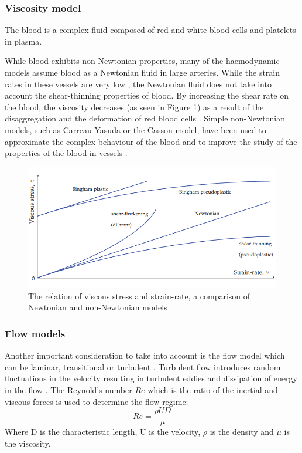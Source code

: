 \subsubsection{Viscosity model}
The blood is a complex fluid composed of red and white blood cells and platelets in plasma.\par

While blood exhibits non-Newtonian properties, many of the haemodynamic models assume blood as a Newtonian fluid in large arteries. While the strain rates in these vessels are very low \cite{Fung1997BiomechanicsCirculation}, the Newtonian fluid does not take into account the shear-thinning properties of blood. By increasing the shear rate on the blood, the viscosity decreases (as seen in Figure \ref{fig:visc}) as a result of the disaggregation and the deformation of red blood cells \cite{Gijsen1999TheModel,Cho1991EffectsFlows}. Simple non-Newtonian models, such as Carreau-Yasuda or the Casson model, have been used to approximate the complex behaviour of the blood and to improve the study of the properties of the blood in vessels  \cite{Alimohammadi2015PredictingApproach}. \par

\begin{figure}[ht!]
\centering
\includegraphics[width=\textwidth]{Figures/viscosity}
\caption{The relation of viscous stress and strain-rate, a comparison of Newtonian and non-Newtonian models \cite{Gabriel2017THEGROWTH}}
\label{fig:visc}
\end{figure}

\subsubsection{Flow models}
Another important consideration to take into account is the flow model which can be laminar, transitional or turbulent \cite{Morris2016ComputationalMedicine}. Turbulent flow introduces random fluctuations in the velocity resulting in turbulent eddies and dissipation of energy in the flow \cite{DongenF.N.vandeVosse2003CardiovascularMechanics}. The Reynold's number $Re$ which is the ratio of the inertial and viscous forces is used to determine the flow regime: 
\begin{equation}
Re = \frac{\rho UD}{\mu}
\end{equation}
Where D is the characteristic length, U is the velocity, $\rho$ is the density and $\mu$ is the viscosity.\par

